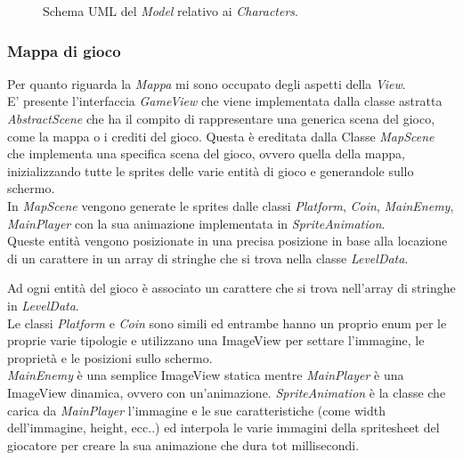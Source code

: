 
\begin{figure}[h]
	\centering{} %
	\caption{Schema UML del \emph{Model} relativo ai \emph{Characters}.}
	\label{img:uml_model_characters}
\end{figure}

\subsubsection*{Mappa di gioco} %

\textsf{\small Per quanto riguarda la \emph{Mappa} mi sono occupato degli aspetti della \emph{View}.}\\

\textsf{\small E' presente l'interfaccia \emph{GameView} che viene implementata dalla classe astratta \emph{AbstractScene} che ha il compito di rappresentare una generica scena del gioco, come la mappa o i crediti del gioco. Questa è ereditata dalla Classe \emph{MapScene} che implementa una specifica scena del gioco, ovvero quella della mappa, inizializzando tutte le sprites delle varie entità di gioco e generandole sullo schermo.}\\

\textsf{\small In \emph{MapScene} vengono generate le sprites dalle classi \emph{Platform}, \emph{Coin}, \emph{MainEnemy}, \emph{MainPlayer} con la sua animazione implementata in \emph{SpriteAnimation}.}\\

\textsf{\small Queste entità vengono posizionate in una precisa posizione in base alla locazione di un carattere in un array di stringhe che si trova nella classe \emph{LevelData}.} %

\textsf{\small Ad ogni entità del gioco è associato un carattere che si trova nell'array di stringhe in \emph{LevelData}.}\\ %

\textsf{\small Le classi \emph{Platform} e \emph{Coin} sono simili ed entrambe hanno un proprio enum per le proprie varie tipologie e utilizzano una ImageView per settare l'immagine, le proprietà e le posizioni sullo schermo.}\\

\textsf{\small \emph{MainEnemy} è una semplice ImageView statica mentre \emph{MainPlayer} è una ImageView dinamica, ovvero con un'animazione.}
\textsf{\small \emph{SpriteAnimation} è la classe che carica da \emph{MainPlayer} l'immagine e le sue caratteristiche (come width dell'immagine, height, ecc..) ed interpola le varie immagini della spritesheet del giocatore per creare la sua animazione che dura tot millisecondi.}\\

